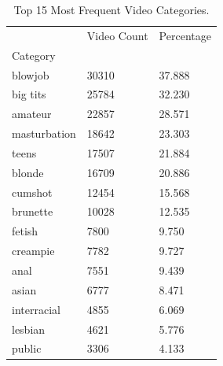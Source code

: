 \begin{table}[htbp]
\centering
\caption{Top 15 Most Frequent Video Categories.}
\label{tab:eda_top_categories}
\begin{tabular}{lll}
\toprule
 & Video Count & Percentage \\
Category &  &  \\
\midrule
blowjob & 30310 & 37.888 \\
big tits & 25784 & 32.230 \\
amateur & 22857 & 28.571 \\
masturbation & 18642 & 23.303 \\
teens & 17507 & 21.884 \\
blonde & 16709 & 20.886 \\
cumshot & 12454 & 15.568 \\
brunette & 10028 & 12.535 \\
fetish & 7800 & 9.750 \\
creampie & 7782 & 9.727 \\
anal & 7551 & 9.439 \\
asian & 6777 & 8.471 \\
interracial & 4855 & 6.069 \\
lesbian & 4621 & 5.776 \\
public & 3306 & 4.133 \\
\bottomrule
\end{tabular}

\end{table}